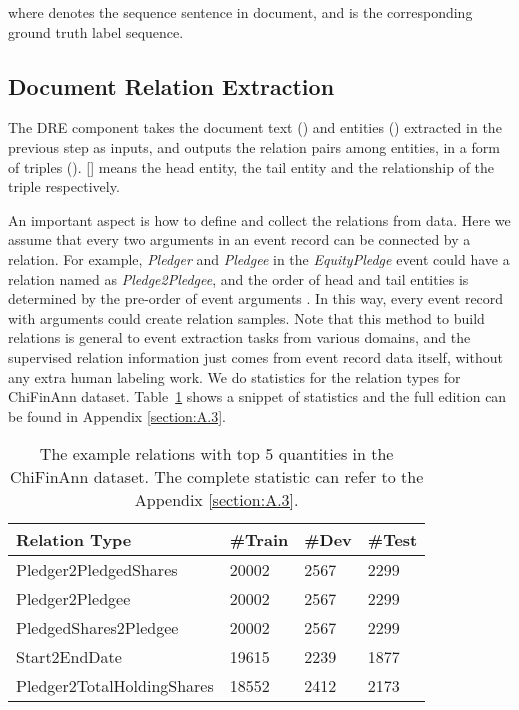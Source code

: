 \documentclass[11pt]{article}
\begin{document}
where  denotes the  sequence sentence in document, and  is the corresponding ground truth label sequence. 


\subsection{Document Relation Extraction}

The DRE component takes the document text () and entities () extracted in the previous step as inputs, and outputs the relation pairs among entities, in a form of triples (). [] means the head entity, the tail entity and the relationship of the  triple respectively. 

An important aspect is how to define and collect the relations from data. Here we assume that every two arguments in an event record can be connected by a relation. For example, \textit{Pledger} and \textit{Pledgee} in the \textit{EquityPledge} event could have a relation named as \textit{Pledge2Pledgee}, and the order of head and tail entities is determined by the pre-order of event arguments \cite{Doc2EDAG}. In this way, every event record with  arguments could create  relation samples. Note that this method to build relations is general to event extraction tasks from various domains, and the supervised relation information just comes from event record data itself, without any extra human labeling work. We do statistics for the relation types for ChiFinAnn dataset. Table~\ref{tab:stats snippet} shows a snippet of statistics and the full edition can be found in Appendix \ref{section:A.3}.

\begin{table}
\centering\small
\begin{tabular}{|l|l|l|l|}
\hline
\textbf{Relation Type} & \textbf{\#Train} & \textbf{\#Dev} & \textbf{\#Test} \\
\hline
Pledger2PledgedShares & 20002 & 2567 & 2299 \\
\hline
Pledger2Pledgee & 20002 & 2567 & 2299 \\
\hline
PledgedShares2Pledgee & 20002 & 2567 & 2299 \\
\hline
Start2EndDate & 19615 & 2239 & 1877 \\
\hline
Pledger2TotalHoldingShares & 18552 & 2412 & 2173 \\
\hline
\end{tabular}
\caption{The example relations with top 5 quantities in the ChiFinAnn dataset. The complete statistic can refer to the Appendix \ref{section:A.3}.}
\label{tab:stats snippet}
\end{table}
\end{document}
